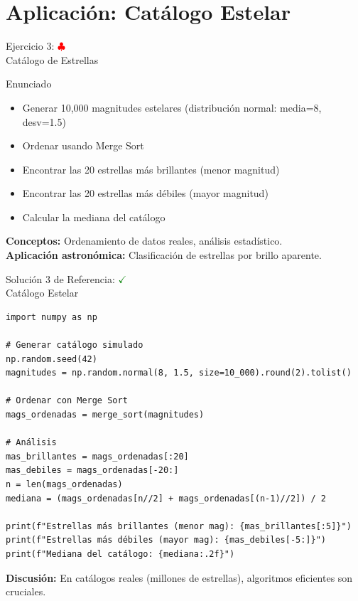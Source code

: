 \documentclass[10pt]{beamer}
\begin{document}
\section{Aplicación: Catálogo Estelar}

\begin{frame}{Ejercicio 3: \hfill \textcolor{red}{$\clubsuit$} \\ Catálogo de Estrellas}
  \begin{block}{Enunciado}
    \begin{itemize}
      \item Generar 10,000 magnitudes estelares (distribución normal: media=8, desv=1.5)
      \item Ordenar usando Merge Sort
      \item Encontrar las 20 estrellas más brillantes (menor magnitud)
      \item Encontrar las 20 estrellas más débiles (mayor magnitud)
      \item Calcular la mediana del catálogo
    \end{itemize}
  \end{block}
  
  \textbf{Conceptos:} Ordenamiento de datos reales, análisis estadístico.
  \\
  \textbf{Aplicación astronómica:} Clasificación de estrellas por brillo aparente.
\end{frame}

\begin{solutionblock}
\begin{frame}[fragile]{Solución 3 de Referencia: \hfill \textcolor{green}{$\checkmark$} \\ Catálogo Estelar}
\begin{verbatim}
import numpy as np

# Generar catálogo simulado
np.random.seed(42)
magnitudes = np.random.normal(8, 1.5, size=10_000).round(2).tolist()

# Ordenar con Merge Sort
mags_ordenadas = merge_sort(magnitudes)

# Análisis
mas_brillantes = mags_ordenadas[:20]
mas_debiles = mags_ordenadas[-20:]
n = len(mags_ordenadas)
mediana = (mags_ordenadas[n//2] + mags_ordenadas[(n-1)//2]) / 2

print(f"Estrellas más brillantes (menor mag): {mas_brillantes[:5]}")
print(f"Estrellas más débiles (mayor mag): {mas_debiles[-5:]}")
print(f"Mediana del catálogo: {mediana:.2f}")
\end{verbatim}

\textbf{Discusión:} En catálogos reales (millones de estrellas), algoritmos eficientes son cruciales.
\end{frame}
\end{solutionblock}
\end{document}
